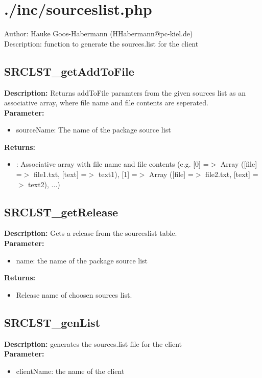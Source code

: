 \newpage\section{./inc/sourceslist.php}
 Author: Hauke Goos-Habermann (HHabermann@pc-kiel.de)\\
 Description: function to generate the sources.list for the client\\

\subsection{SRCLST\_getAddToFile}
\textbf{Description:} Returns addToFile paramters from the given sources list as an associative array, where file name and file contents are seperated.\\
\textbf{Parameter:}
\begin{itemize}
\item sourceName: The name of the package source list
\end{itemize}
\textbf{Returns:}
\begin{itemize}
\item : Associative array with file name and file contents (e.g. [0] =$>$ Array ([file] =$>$ file1.txt, [text] =$>$ text1), [1] =$>$ Array ([file] =$>$ file2.txt, [text] =$>$ text2), ...)
\end{itemize}

\subsection{SRCLST\_getRelease}
\textbf{Description:} Gets a release from the sourceslist table.\\
\textbf{Parameter:}
\begin{itemize}
\item name: the name of the package source list
\end{itemize}
\textbf{Returns:}
\begin{itemize}
\item Release name of choosen sources list.
\end{itemize}

\subsection{SRCLST\_genList}
\textbf{Description:} generates the sources.list file for the client\\
\textbf{Parameter:}
\begin{itemize}
\item clientName: the name of the client
\end{itemize}

